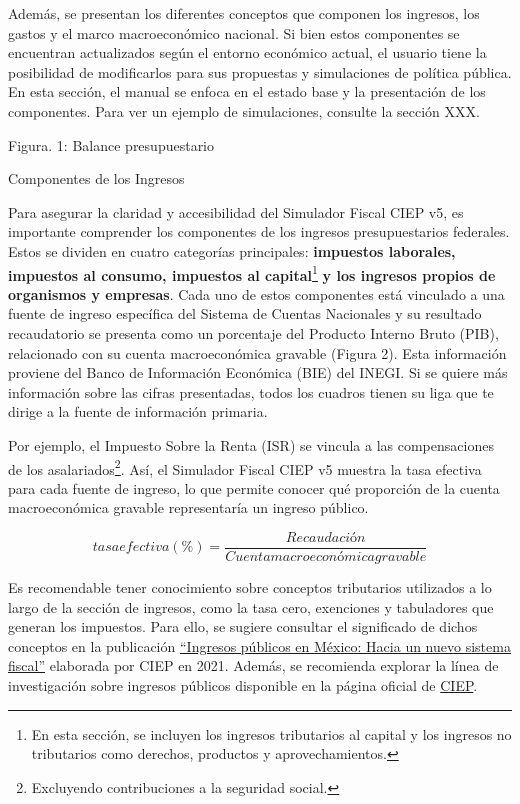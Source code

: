 Además, se presentan los diferentes conceptos que componen los ingresos,
los gastos y el marco macroeconómico nacional. Si bien estos componentes
se encuentran actualizados según el entorno económico actual, el usuario
tiene la posibilidad de modificarlos para sus propuestas y simulaciones
de política pública. En esta sección, el manual se enfoca en el estado
base y la presentación de los componentes. Para ver un ejemplo de
simulaciones, consulte la sección XXX.

Figura. 1: Balance presupuestario


Componentes de los Ingresos

Para asegurar la claridad y accesibilidad del Simulador Fiscal CIEP v5,
es importante comprender los componentes de los ingresos presupuestarios
federales. Estos se dividen en cuatro categorías principales:
\textbf{impuestos laborales, impuestos al consumo, impuestos al
capital}\footnote{En esta sección, se incluyen los ingresos tributarios
  al capital y los ingresos no tributarios como derechos, productos y
  aprovechamientos.} \textbf{y los ingresos propios de organismos y
empresas}. Cada uno de estos componentes está vinculado a una fuente de
ingreso específica del Sistema de Cuentas Nacionales y su resultado
recaudatorio se presenta como un porcentaje del Producto Interno Bruto
(PIB), relacionado con su cuenta macroeconómica gravable (Figura 2).
Esta información proviene del Banco de Información Económica (BIE) del
INEGI. Si se quiere más información sobre las cifras presentadas, todos
los cuadros tienen su liga que te dirige a la fuente de información
primaria.

Por ejemplo, el Impuesto Sobre la Renta (ISR) se vincula a las
compensaciones de los asalariados\footnote{Excluyendo contribuciones a
  la seguridad social.}. Así, el Simulador Fiscal CIEP v5 muestra la
tasa efectiva para cada fuente de ingreso, lo que permite conocer qué
proporción de la cuenta macroeconómica gravable representaría un ingreso
público.

\[tasaefectiva\left( \text{\%} \right) = \frac{Recaudación}{Cuentamacroeconómicagravable}\]

Es recomendable tener conocimiento sobre conceptos tributarios
utilizados a lo largo de la sección de ingresos, como la tasa cero,
exenciones y tabuladores que generan los impuestos. Para ello, se
sugiere consultar el significado de dichos conceptos en la publicación
\href{https://ingresosenmexico.ciep.mx/}{``Ingresos públicos en México:
Hacia un nuevo sistema fiscal''} elaborada por CIEP en 2021. Además, se
recomienda explorar la línea de investigación sobre ingresos públicos
disponible en la página oficial de
\href{https://ciep.mx/investigaciones/}{CIEP}.

